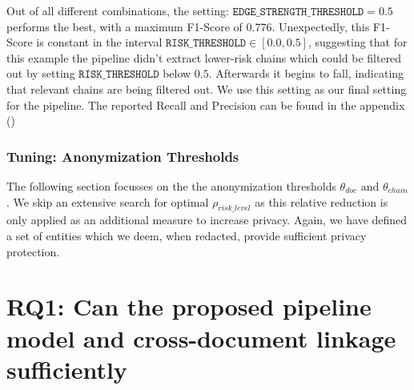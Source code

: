 Out of all different combinations, the setting: $\texttt{EDGE\_STRENGTH\_THRESHOLD} = 0.5$ performs the best, with a maximum F1-Score of 0.776. Unexpectedly, this F1-Score is constant in the interval $\texttt{RISK\_THRESHOLD} \in [0.0,0.5]$, suggesting that for this example the pipeline didn't extract lower-risk chains which could be filtered out by setting $\texttt{RISK\_THRESHOLD}$ below $0.5$. Afterwards it begins to fall, indicating that relevant chains are being filtered out. We use this setting as our final setting for the pipeline. The reported Recall and Precision can be found in the appendix () %

\subsubsection{Tuning: Anonymization Thresholds}
The following section focusses on the the anonymization thresholds $\theta_{doc}$ and $\theta_{chain}$. We skip an extensive search for optimal $\rho_{risk\_level}$ as this relative reduction is only applied as an additional measure to increase privacy. 
Again, we have defined a set of entities which we deem, when redacted, provide sufficient privacy protection.



\section{RQ1: Can the proposed pipeline model and cross-document linkage sufficiently}


